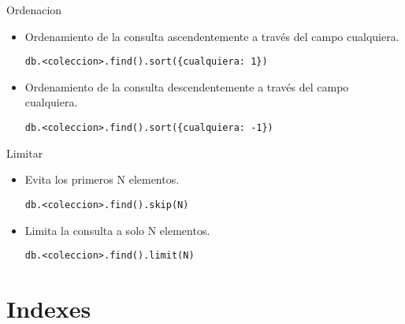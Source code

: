 \documentclass[12pt]{beamer}
\begin{document}
\begin{frame}[fragile]{Ordenacion}

  \begin{itemize}
    \item Ordenamiento de la consulta ascendentemente a través del campo cualquiera.

    \begin{verbatim}
db.<coleccion>.find().sort({cualquiera: 1})
    \end{verbatim}

    \item Ordenamiento de la consulta descendentemente a través del campo cualquiera.

    \begin{verbatim}
db.<coleccion>.find().sort({cualquiera: -1})
    \end{verbatim}

  \end{itemize}
\end{frame}

\begin{frame}[fragile]{Limitar}
  \begin{itemize}
    \item Evita los primeros N elementos.

    \begin{verbatim}
db.<coleccion>.find().skip(N)
    \end{verbatim}

    \item Limita la consulta a solo N elementos.

    \begin{verbatim}
db.<coleccion>.find().limit(N)
    \end{verbatim}

  \end{itemize}
\end{frame}

\section{Indexes}
\end{document}
